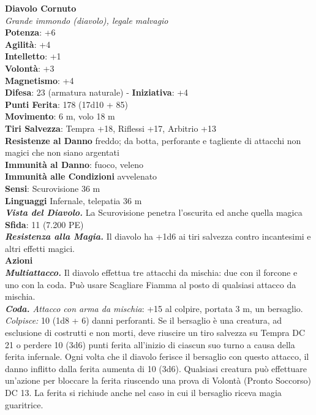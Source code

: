 \begin{multicols}{2}
\medskip\textbf{Diavolo Cornuto}\\
\emph{Grande immondo (diavolo), legale malvagio}\\
\textbf{Potenza}: +6\\
\textbf{Agilità}: +4\\
\textbf{Intelletto}: +1\\
\textbf{Volontà}: +3\\
\textbf{Magnetismo}: +4\\
\textbf{Difesa}: 23 (armatura naturale) - \textbf{Iniziativa}: +4\\
\textbf{Punti Ferita}: 178 (17d10 + 85)\\
\textbf{Movimento}: 6 m, volo 18 m\\
\textbf{Tiri Salvezza}: Tempra +18, Riflessi +17, Arbitrio +13\\
\textbf{Resistenze al Danno} freddo; da botta, perforante e tagliente di attacchi non magici che non siano argentati\\
\textbf{Immunità al Danno}: fuoco, veleno\\
\textbf{Immunità alle Condizioni} avvelenato\\
\textbf{Sensi}: Scurovisione 36 m\\
\textbf{Linguaggi} Infernale, telepatia 36 m \\
\emph{\textbf{Vista del Diavolo.}} La Scurovisione penetra l'oscurita ed anche quella magica\\
\textbf{Sfida}: 11 (7.200 PE)\smallskip\\
\emph{\textbf{Resistenza alla Magia.}} Il diavolo ha +1d6 ai tiri salvezza contro incantesimi e altri effetti magici.\\
\smallskip\textbf{Azioni}\\
\emph{\textbf{Multiattacco.}} Il diavolo effettua tre attacchi da mischia: due con il forcone e uno con la coda. Può usare Scagliare Fiamma al posto di qualsiasi attacco da mischia.\\
\emph{\textbf{Coda.} Attacco con arma da mischia}: +15 al colpire, portata 3 m, un bersaglio.\\
\emph{Colpisce:} 10 (1d8 + 6) danni perforanti. Se il bersaglio è una creatura, ad esclusione di costrutti e non morti, deve riuscire un tiro salvezza su Tempra DC  21 o perdere 10 (3d6) punti ferita all'inizio di ciascun suo turno a causa della ferita infernale. Ogni volta che il diavolo ferisce il bersaglio con questo attacco, il danno inflitto dalla ferita aumenta di 10 (3d6). Qualsiasi creatura può effettuare un'azione per bloccare la ferita riuscendo una prova di Volontà (Pronto Soccorso) DC  13. La ferita si richiude anche nel caso in cui il bersaglio riceva magia guaritrice.\\

\end{multicols}
